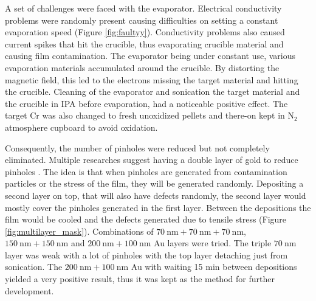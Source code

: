 \documentclass[final]{jyflluk}
\begin{document}
A set of challenges were faced with the evaporator. Electrical conductivity problems were randomly present causing difficulties on setting a constant evaporation speed (Figure \ref{fig:faultyy}). Conductivity problems also caused current spikes that hit the crucible, thus evaporating crucible material and causing film contamination. The evaporator being under constant use, various evaporation materials accumulated around the crucible. By distorting the magnetic field, this led to the electrons missing the target material and hitting the crucible. Cleaning of the evaporator and sonication the target material and the crucible in IPA before evaporation, had a noticeable positive effect. The target Cr was also changed to fresh unoxidized pellets and there-on kept in $\mathrm{N_2}$ atmosphere cupboard to avoid oxidation. 

Consequently, the number of pinholes were reduced but not completely eliminated. Multiple researches suggest having a double layer of gold to reduce pinholes \cite{iliescu2008wet,Hgglund2013CharacterizationOM,bu2004new}. The idea is that when pinholes are generated from contamination particles or the stress of the film, they will be generated randomly. Depositing a second layer on top, that will also have defects randomly, the second layer would mostly cover the pinholes generated in the first layer. Between the depositions the film would be cooled and the defects generated due to tensile stress (Figure \ref{fig:multilayer_mask}). 
Combinations of $\SI{70}{\nano \metre} + \SI{70}{\nano \metre} + \SI{70}{\nano \metre}$, $\SI{150}{\nano \metre}+ \SI{150}{\nano \metre}$ and $\SI{200}{\nano \metre} + \SI{100}{\nano \metre}$ Au layers were tried. The triple $\SI{70}{\nano \metre}$ layer was weak with a lot of pinholes with the top layer detaching just from sonication. The $\SI{200}{\nano \metre} + \SI{100}{\nano \metre}$  Au with waiting 15 min between depositions yielded a very positive result, thus it was kept as the method for further development.
\newpage
\end{document}
